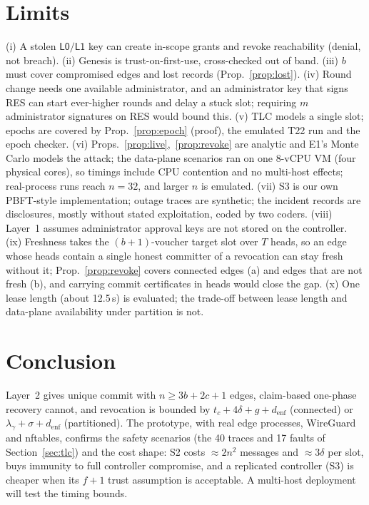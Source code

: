 \documentclass[conference]{IEEEtran}
\begin{document}
\section{Limits}\label{sec:limits}
(i) A stolen $\mathsf{L0}/\mathsf{L1}$ key can create in-scope grants and revoke reachability (denial, not breach). (ii) Genesis is trust-on-first-use, cross-checked out of band. (iii) $b$ must cover compromised edges and lost records (Prop.~\ref{prop:lost}). (iv) Round change needs one available administrator, and an administrator key that signs RES can start ever-higher rounds and delay a stuck slot; requiring $m$ administrator signatures on RES would bound this. (v) TLC models a single slot; epochs are covered by Prop.~\ref{prop:epoch} (proof), the emulated T22 run and the epoch checker. (vi) Props.~\ref{prop:live},~\ref{prop:revoke} are analytic and E1's Monte Carlo models the attack; the data-plane scenarios ran on one 8-vCPU VM (four physical cores), so timings include CPU contention and no multi-host effects; real-process runs reach $n{=}32$, and larger $n$ is emulated. (vii) S3 is our own PBFT-style implementation; outage traces are synthetic; the incident records are disclosures, mostly without stated exploitation, coded by two coders. (viii) Layer~1 assumes administrator approval keys are not stored on the controller. (ix) Freshness takes the $(b{+}1)$-voucher target slot over $T$ heads, so an edge whose heads contain a single honest committer of a revocation can stay fresh without it; Prop.~\ref{prop:revoke} covers connected edges (a) and edges that are not fresh (b), and carrying commit certificates in heads would close the gap. (x) One lease length (about 12.5\,s) is evaluated; the trade-off between lease length and data-plane availability under partition is not.

\section{Conclusion}
Layer~2 gives unique commit with $n\ge3b+2c+1$ edges, claim-based one-phase recovery cannot, and revocation is bounded by $t_c+4\delta+g+d_{\mathrm{enf}}$ (connected) or $\lambda_\gamma+\sigma+d_{\mathrm{enf}}$ (partitioned). The prototype, with real edge processes, WireGuard and nftables, confirms the safety scenarios (the 40 traces and 17 faults of Section~\ref{sec:tlc}) and the cost shape: S2 costs $\approx2n^2$ messages and $\approx3\delta$ per slot, buys immunity to full controller compromise, and a replicated controller (S3) is cheaper when its $f{+}1$ trust assumption is acceptable. A multi-host deployment will test the timing bounds.



\end{document}
